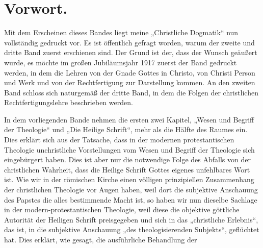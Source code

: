 \section*{Vorwort.}\par Mit dem Erscheinen dieses Bandes liegt meine „Christliche Dogmatik“ nun vollständig gedruckt vor. Es ist öffentlich gefragt worden, warum der zweite und dritte Band zuerst erschienen sind. Der Grund ist der, dass der Wunsch geäußert wurde, es möchte im großen Jubiläumsjahr 1917 zuerst der Band gedruckt werden, in dem die Lehren von der Gnade Gottes in Christo, von Christi Person und Werk und von der Rechtfertigung zur Darstellung kommen. An den zweiten Band schloss sich naturgemäß der dritte Band, in dem die Folgen der christlichen Rechtfertigungslehre beschrieben werden.\par In dem vorliegenden Bande nehmen die ersten zwei Kapitel, „Wesen und Begriff der Theologie“ und „Die Heilige Schrift“, mehr als die Hälfte des Raumes ein. Dies erklärt sich aus der Tatsache, dass in der modernen protestantischen Theologie unchristliche Vorstellungen vom Wesen und Begriff der Theologie sich eingebürgert haben. Dies ist aber nur die notwendige Folge des Abfalls von der christlichen Wahrheit, dass die Heilige Schrift Gottes eigenes unfehlbares Wort ist. Wie wir in der römischen Kirche einen völligen prinzipiellen Zusammenhang der christlichen Theologie vor Augen haben, weil dort die subjektive Anschauung des Papstes die alles bestimmende Macht ist, so haben wir nun dieselbe Sachlage in der modern-protestantischen Theologie, weil diese die objektive göttliche Autorität der Heiligen Schrift preisgegeben und sich in das „christliche Erlebnis“, das ist, in die subjektive Anschauung „des theologisierenden Subjekts“, geflüchtet hat. Dies erklärt, wie gesagt, die ausführliche Behandlung der
